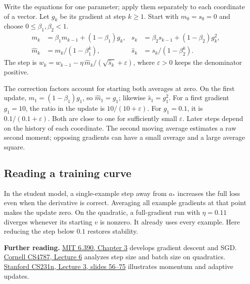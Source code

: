 \begin{definition}[Adam]
Write the equations for one parameter; apply them separately to each
coordinate of a vector. Let \(g_k\) be its gradient at step \(k\ge1\).
Start with \(m_0=s_0=0\) and choose \(0\le\beta_1,\beta_2<1\).
\begin{align*}
 m_k &=\beta_1m_{k-1}+(1-\beta_1)g_k,&
 s_k &=\beta_2s_{k-1}+(1-\beta_2)g_k^2,\\
 \widehat m_k&=m_k/(1-\beta_1^k),&
 \widehat s_k&=s_k/(1-\beta_2^k).
\end{align*}
The step is \(w_k=w_{k-1}-\eta\,\widehat m_k/(\sqrt{\widehat s_k}+\varepsilon)\),
where \(\varepsilon>0\) keeps the denominator positive.
\end{definition}
The correction factors account for starting both averages at zero. On the
first update, \(m_1=(1-\beta_1)g_1\), so \(\widehat m_1=g_1\);
likewise \(\widehat s_1=g_1^2\). For a first gradient \(g_1=10\), the
ratio in the update is \(10/(10+\varepsilon)\). For \(g_1=0.1\), it is
\(0.1/(0.1+\varepsilon)\). Both are close to one for sufficiently small
\(\varepsilon\). Later steps depend on the history of each coordinate.
The second moving average estimates a raw second moment; opposing
gradients can have a small average and a large average square.

\subsection*{Reading a training curve}
In the student model, a single-example step away from \(a_*\) increases
the full loss even when the derivative is correct. Averaging all example
gradients at that point makes the update zero. On the quadratic, a
full-gradient run with \(\eta=0.11\) diverges whenever its starting \(v\)
is nonzero. It already uses every example. Here reducing the step below
\(0.1\) restores stability.

\smallskip
{\small\textbf{Further reading.}
\href{https://introml.mit.edu/_static/spring23/LectureNotes/6_390_lecture_notes_spring23.pdf}{MIT 6.390, Chapter 3} develops gradient descent and SGD.
\href{https://www.cs.cornell.edu/courses/cs4787/2026fa/lectures/lecture6.html}{Cornell CS4787, Lecture 6} analyzes step size and batch size on quadratics.
\href{https://cs231n.stanford.edu/slides/2025/lecture_3.pdf}{Stanford CS231n, Lecture 3, slides 56--75} illustrates momentum and adaptive updates.}
